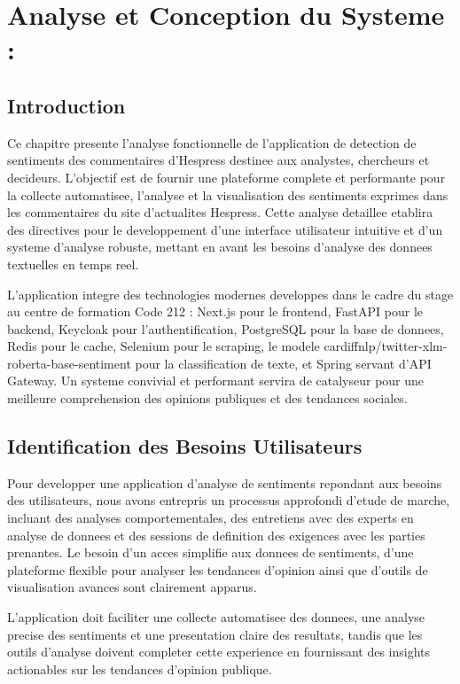 \chapter{Analyse et Conception du Systeme :}

\section{Introduction}

Ce chapitre presente l'analyse fonctionnelle de l'application de detection de sentiments des commentaires d'Hespress destinee aux analystes, chercheurs et decideurs. L'objectif est de fournir une plateforme complete et performante pour la collecte automatisee, l'analyse et la visualisation des sentiments exprimes dans les commentaires du site d'actualites Hespress. Cette analyse detaillee etablira des directives pour le developpement d'une interface utilisateur intuitive et d'un systeme d'analyse robuste, mettant en avant les besoins d'analyse des donnees textuelles en temps reel.

L'application integre des technologies modernes developpes dans le cadre du stage au centre de formation Code 212 : Next.js pour le frontend, FastAPI pour le backend, Keycloak pour l'authentification, PostgreSQL pour la base de donnees, Redis pour le cache, Selenium pour le scraping, le modele cardiffnlp/twitter-xlm-roberta-base-sentiment pour la classification de texte, et Spring servant d'API Gateway. Un systeme convivial et performant servira de catalyseur pour une meilleure comprehension des opinions publiques et des tendances sociales.

\section{Identification des Besoins Utilisateurs}

Pour developper une application d'analyse de sentiments repondant aux besoins des utilisateurs, nous avons entrepris un processus approfondi d'etude de marche, incluant des analyses comportementales, des entretiens avec des experts en analyse de donnees et des sessions de definition des exigences avec les parties prenantes. Le besoin d'un acces simplifie aux donnees de sentiments, d'une plateforme flexible pour analyser les tendances d'opinion ainsi que d'outils de visualisation avances sont clairement apparus.

L'application doit faciliter une collecte automatisee des donnees, une analyse precise des sentiments et une presentation claire des resultats, tandis que les outils d'analyse doivent completer cette experience en fournissant des insights actionables sur les tendances d'opinion publique.

